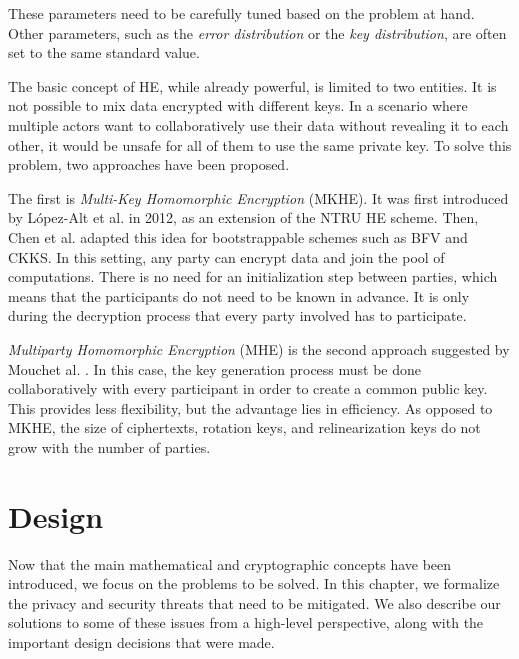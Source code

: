 \documentclass[a4paper,11pt,oneside]{report}
\begin{document}
These parameters need to be carefully tuned based on the problem at hand. 
Other parameters, such as the \emph{error distribution} or the \emph{key distribution}, are often set to the same standard value.

The basic concept of HE, while already powerful, is limited to two entities.
It is not possible to mix data encrypted with different keys.
In a scenario where multiple actors want to collaboratively use their data without revealing it to each other, it would be unsafe for all of them to use the same private key.
To solve this problem, two approaches have been proposed.

The first is \emph{Multi-Key Homomorphic Encryption} (MKHE).
It was first introduced by López-Alt et al. \cite{lopez-alt_--fly_2012} in 2012, as an extension of the NTRU HE scheme. 
Then, Chen et al. \cite{chen_efficient_2019} adapted this idea for bootstrappable schemes such as BFV and CKKS.
In this setting, any party can encrypt data and join the pool of computations.
There is no need for an initialization step between parties, which means that the participants do not need to be known in advance.
It is only during the decryption process that every party involved has to participate.

\emph{Multiparty Homomorphic Encryption} (MHE) is the second approach suggested by Mouchet al. \cite{mouchet_multiparty_2021}.
In this case, the key generation process must be done collaboratively with every participant in order to create a common public key.
This provides less flexibility, but the advantage lies in efficiency.
As opposed to MKHE, the size of ciphertexts, rotation keys, and relinearization keys do not grow with the number of parties.


\chapter{Design}\label{chap:design}



Now that the main mathematical and cryptographic concepts have been introduced, we focus on the problems to be solved.
In this chapter, we formalize the privacy and security threats that need to be mitigated.
We also describe our solutions to some of these issues from a high-level perspective, along with the important design decisions that were made.
\end{document}
